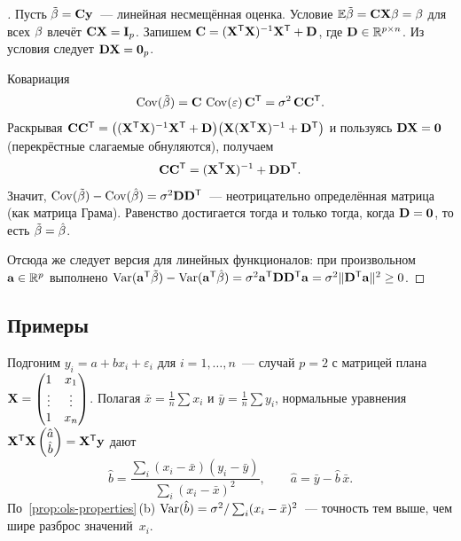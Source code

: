 \begin{proof}[]
Пусть $\tilde{\mathbf{\beta}} = \mathbf{C} \mathbf{y}$~--- линейная несмещённая оценка. Условие $\mathbb{E} \tilde{\mathbf{\beta}} = \mathbf{C} \mathbf{X} \mathbf{\beta} = \mathbf{\beta}$ для всех $\mathbf{\beta}$ влечёт $\mathbf{C} \mathbf{X} = \mathbf{I}_p$. Запишем $\mathbf{C} = (\mathbf{X}^{\mathsf{T}} \mathbf{X})^{-1} \mathbf{X}^{\mathsf{T}} + \mathbf{D}$, где $\mathbf{D} \in \mathbb{R}^{p \times n}$. Из условия следует $\mathbf{D} \mathbf{X} = \mathbf{0}_p$.

Ковариация
\[
  \operatorname{Cov}(\tilde{\mathbf{\beta}}) = \mathbf{C}\, \operatorname{Cov}(\mathbf{\varepsilon})\, \mathbf{C}^{\mathsf{T}} = \sigma^2\, \mathbf{C} \mathbf{C}^{\mathsf{T}}.
\]
Раскрывая $\mathbf{C} \mathbf{C}^{\mathsf{T}} = \bigl((\mathbf{X}^{\mathsf{T}} \mathbf{X})^{-1} \mathbf{X}^{\mathsf{T}} + \mathbf{D}\bigr)\bigl(\mathbf{X} (\mathbf{X}^{\mathsf{T}} \mathbf{X})^{-1} + \mathbf{D}^{\mathsf{T}}\bigr)$ и пользуясь $\mathbf{D} \mathbf{X} = \mathbf{0}$ (перекрёстные слагаемые обнуляются), получаем
\[
  \mathbf{C} \mathbf{C}^{\mathsf{T}} = (\mathbf{X}^{\mathsf{T}} \mathbf{X})^{-1} + \mathbf{D} \mathbf{D}^{\mathsf{T}}.
\]
Значит, $\operatorname{Cov}(\tilde{\mathbf{\beta}}) - \operatorname{Cov}(\hat{\mathbf{\beta}}) = \sigma^2 \mathbf{D} \mathbf{D}^{\mathsf{T}}$~--- неотрицательно определённая матрица (как матрица Грама). Равенство достигается тогда и только тогда, когда $\mathbf{D} = \mathbf{0}$, то есть $\tilde{\mathbf{\beta}} = \hat{\mathbf{\beta}}$.

Отсюда же следует версия для линейных функционалов: при произвольном $\mathbf{a} \in \mathbb{R}^p$ выполнено $\operatorname{Var}(\mathbf{a}^{\mathsf{T}} \tilde{\mathbf{\beta}}) - \operatorname{Var}(\mathbf{a}^{\mathsf{T}} \hat{\mathbf{\beta}}) = \sigma^2 \mathbf{a}^{\mathsf{T}} \mathbf{D} \mathbf{D}^{\mathsf{T}} \mathbf{a} = \sigma^2 \|\mathbf{D}^{\mathsf{T}} \mathbf{a}\|^2 \geq 0$.
\end{proof}

\subsection*{Примеры}

\begin{example}
\label{ex:simple-linear-regression}
Подгоним $y_i = a + b x_i + \varepsilon_i$ для $i = 1, \dots, n$~--- случай $p = 2$ с матрицей плана $\mathbf{X} = \begin{pmatrix} 1 & x_1 \\ \vdots & \vdots \\ 1 & x_n \end{pmatrix}$. Полагая $\bar x = \tfrac{1}{n}\sum x_i$ и $\bar y = \tfrac{1}{n}\sum y_i$, нормальные уравнения $\mathbf{X}^{\mathsf{T}} \mathbf{X} \begin{pmatrix} \hat a \\ \hat b \end{pmatrix} = \mathbf{X}^{\mathsf{T}} \mathbf{y}$ дают
\[
  \hat b = \frac{\sum_{i} (x_i - \bar x)(y_i - \bar y)}{\sum_{i} (x_i - \bar x)^2}, \qquad
  \hat a = \bar y - \hat b\, \bar x.
\]
По~\cref{prop:ols-properties}\,(b) $\operatorname{Var}(\hat b) = \sigma^2 / \sum_i (x_i - \bar x)^2$~--- точность тем выше, чем шире разброс значений~$x_i$.
\end{example}

